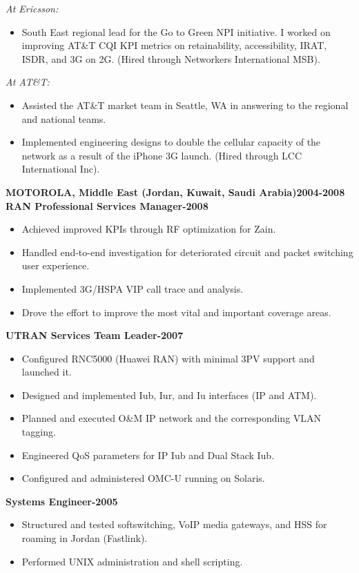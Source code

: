 \documentclass{article}
\begin{document}
\textit{At Ericsson:}
\begin{itemize}
\item South East regional lead for the Go to Green NPI initiative.  I worked on improving AT\&T CQI KPI metrics on retainability, accessibility, IRAT, ISDR, and 3G on 2G. (Hired through Networkers International MSB).
\end{itemize}
\textit{At AT\&T:}
\begin{itemize}
\item Assisted the AT\&T market team in Seattle, WA in answering to the regional and national teams.
\item Implemented engineering designs to double the cellular capacity of the network as a result of the iPhone 3G launch. (Hired through LCC International Inc).
\end{itemize}
\newpage\noindent
\textbf{MOTOROLA, Middle East (Jordan, Kuwait, Saudi Arabia)\hfill 2004-2008}\\
\textbf{RAN Professional Services Manager\hfill{}-2008}
\begin{itemize}
\item Achieved improved KPIs through RF optimization for Zain. 
\item Handled end-to-end investigation for deteriorated circuit and packet switching user experience. 
\item Implemented 3G/HSPA VIP call trace and analysis. 
\item Drove the effort to improve the most vital and important coverage areas. 
\end{itemize}
\textbf{UTRAN Services Team Leader\hfill{}-2007}
\begin{itemize}
\item Configured RNC5000 (Huawei RAN) with minimal 3PV support and launched it.
\item Designed and implemented Iub, Iur, and Iu interfaces (IP and ATM). 
\item Planned and executed O\&M IP network and the corresponding VLAN tagging. 
\item Engineered QoS parameters for IP Iub and Dual Stack Iub. 
\item Configured and administered OMC-U running on Solaris. 
\end{itemize}
\textbf{Systems Engineer\hfill{}-2005}
\begin{itemize}
\item Structured and tested softswitching, VoIP media gateways, and HSS for roaming in Jordan (Fastlink). 
\item Performed UNIX administration and shell scripting. 
\end{itemize}
\end{document}
